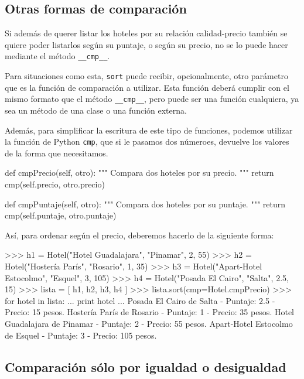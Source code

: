 \subsection{Otras formas de comparación}

Si además de querer listar los hoteles por su relación calidad-precio
también se quiere poder listarlos según su puntaje, o según su precio, no
se lo puede hacer mediante el método \lstinline!__cmp__!.

Para situaciones como esta, \lstinline!sort! puede recibir, opcionalmente,
otro parámetro que es la función de comparación a utilizar.  Esta función
deberá cumplir con el mismo formato que el método \lstinline!__cmp__!, pero
puede ser una función cualquiera, ya sea un método de una clase o una
función externa.

Además, para simplificar la escritura de este tipo de funciones, podemos
utilizar la función de Python \lstinline!cmp!, que si le pasamos dos
númeroes, devuelve los valores de la forma que necesitamos.

\begin{codigo-python-sn}
    def cmpPrecio(self, otro):
        """ Compara dos hoteles por su precio. """
        return cmp(self.precio, otro.precio)

    def cmpPuntaje(self, otro):
        """ Compara dos hoteles por su puntaje. """
        return cmp(self.puntaje, otro.puntaje)
\end{codigo-python-sn}

Así, para ordenar según el precio, deberemos hacerlo de la siguiente forma:

\begin{codigo-python-sn}
>>> h1 = Hotel("Hotel Guadalajara", "Pinamar", 2, 55)
>>> h2 = Hotel("Hostería París", "Rosario", 1, 35)
>>> h3 = Hotel("Apart-Hotel Estocolmo", "Esquel", 3, 105)
>>> h4 = Hotel("Posada El Cairo", "Salta", 2.5, 15)
>>> lista = [ h1, h2, h3, h4 ]
>>> lista.sort(cmp=Hotel.cmpPrecio)
>>> for hotel in lista:
...     print hotel
...
Posada El Cairo de Salta - Puntaje: 2.5 - Precio: 15 pesos.
Hostería París de Rosario - Puntaje: 1 - Precio: 35 pesos.
Hotel Guadalajara de Pinamar - Puntaje: 2 - Precio: 55 pesos.
Apart-Hotel Estocolmo de Esquel - Puntaje: 3 - Precio: 105 pesos.
\end{codigo-python-sn}

\subsection{Comparación sólo por igualdad o desigualdad}

